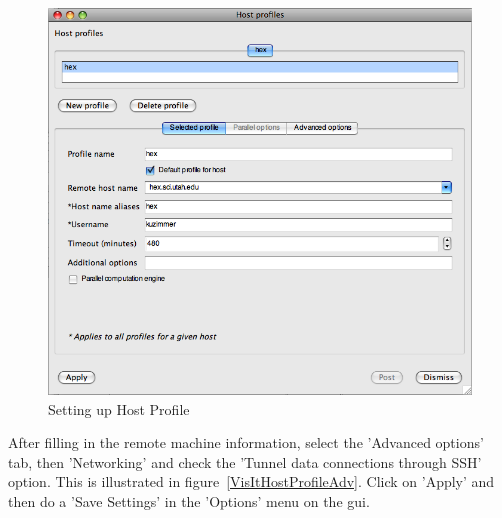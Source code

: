 \documentclass[12pt]{article}
\begin{document}
\begin{figure}

   \vspace{-25pt}
  \begin{center}
    \includegraphics[width=.425\textwidth]{VisItHostProfile.png}
  \end{center}
  \caption{Setting up Host Profile}
   \vspace{-20pt}
  \label{VisItHostProfile}

\end{figure}


After filling in the remote machine information, select the 'Advanced
options' tab, then 'Networking' and check the 'Tunnel data connections
through SSH' option. This is illustrated in
figure~\ref{VisItHostProfileAdv}. Click on 'Apply' and then do a 'Save
Settings' in the 'Options' menu on the gui.





\end{document}
